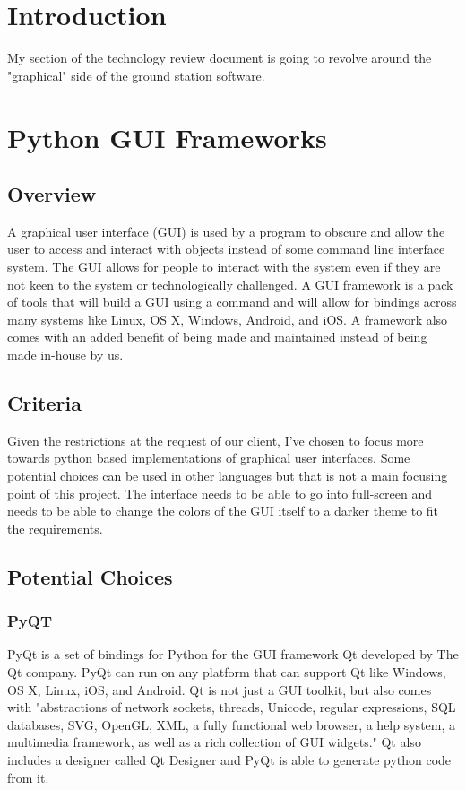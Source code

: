 \documentclass[onecolumn, draftclsnofoot, 10pt, compsoc]{IEEEtran}
\begin{document}
\section{Introduction}
My section of the technology review document is going to revolve around the "graphical" side of the ground station software. 
\section{Python GUI Frameworks}
\subsection{Overview}
A graphical user interface (GUI) is used by a program to obscure and allow the user to access and interact with objects instead of some command line interface system.
The GUI allows for people to interact with the system even if they are not keen to the system or technologically challenged.
A GUI framework is a pack of tools that will build a GUI using a command and will allow for bindings across many systems like Linux, OS X, Windows, Android, and iOS.
A framework also comes with an added benefit of being made and maintained instead of being made in-house by us.
\subsection{Criteria}
Given the restrictions at the request of our client, I've chosen to focus more towards python based implementations of graphical user interfaces. 
Some potential choices can be used in other languages but that is not a main focusing point of this project.
The interface needs to be able to go into full-screen and needs to be able to change the colors of the GUI itself to a darker theme to fit the requirements.
\subsection{Potential Choices}
\subsubsection{PyQT}
PyQt is a set of bindings for Python for the GUI framework Qt developed by The Qt company. \cite{PyQt}
PyQt can run on any platform that can support Qt like Windows, OS X, Linux, iOS, and Android.
Qt is not just a GUI toolkit, but also comes with "abstractions of network sockets, threads, Unicode, regular expressions, SQL databases, SVG, OpenGL, XML, a fully functional web browser, a help system, a multimedia framework, as well as a rich collection of GUI widgets." \cite{PyQt}
Qt also includes a designer called Qt Designer and PyQt is able to generate python code from it.
\end{document}
